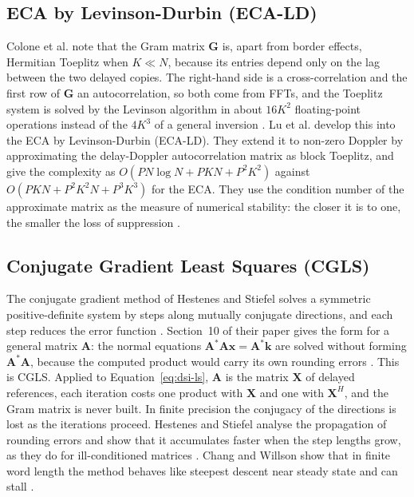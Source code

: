 \subsection{ECA by Levinson-Durbin (ECA-LD)}
\label{subsec:th.dsi.ecald}
\todo{}
Colone et al. \citep{colone2016} note that the Gram matrix $\mathbf{G}$ is, apart from border effects, Hermitian Toeplitz when $K \ll N$, because its entries depend only on the lag between the two delayed copies. The right-hand side is a cross-correlation and the first row of $\mathbf{G}$ an autocorrelation, so both come from FFTs, and the Toeplitz system is solved by the Levinson algorithm in about $16K^2$ floating-point operations instead of the $4K^3$ of a general inversion \citep{colone2016}. Lu et al. \citep{lu2026} develop this into the ECA by Levinson-Durbin (ECA-LD). They extend it to non-zero Doppler by approximating the delay-Doppler autocorrelation matrix as block Toeplitz, and give the complexity as $O(PN \log N + PKN + P^2 K^2)$ against $O(PKN + P^2 K^2 N + P^3 K^3)$ for the ECA. They use the condition number of the approximate matrix as the measure of numerical stability: the closer it is to one, the smaller the loss of suppression \citep{lu2026}.

\subsection{Conjugate Gradient Least Squares (CGLS)}
\label{subsec:th.dsi.cgls}
\todo{}
The conjugate gradient method of Hestenes and Stiefel \citep{hestenes1952} solves a symmetric positive-definite system by steps along mutually conjugate directions, and each step reduces the error function \citep{hestenes1952}. Section~10 of their paper gives the form for a general matrix $\mathbf{A}$: the normal equations $\mathbf{A}^* \mathbf{A} \mathbf{x} = \mathbf{A}^* \mathbf{k}$ are solved without forming $\mathbf{A}^* \mathbf{A}$, because the computed product would carry its own rounding errors \citep{hestenes1952}. This is CGLS. Applied to Equation~\ref{eq:dsi-ls}, $\mathbf{A}$ is the matrix $\mathbf{X}$ of delayed references, each iteration costs one product with $\mathbf{X}$ and one with $\mathbf{X}^H$, and the Gram matrix is never built. In finite precision the conjugacy of the directions is lost as the iterations proceed. Hestenes and Stiefel analyse the propagation of rounding errors and show that it accumulates faster when the step lengths grow, as they do for ill-conditioned matrices \citep{hestenes1952}. Chang and Willson \citep{chang2000} show that in finite word length the method behaves like steepest descent near steady state and can stall .

